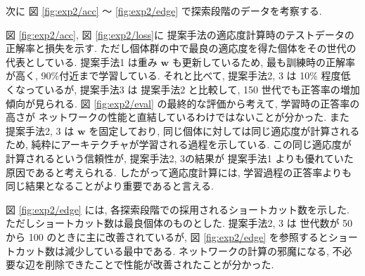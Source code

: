 次に 図 \ref{fig:exp2/acc} ～ \ref{fig:exp2/edge} で探索段階のデータを考察する.

図 \ref{fig:exp2/acc}, 図 \ref{fig:exp2/loss}に
提案手法の適応度計算時のテストデータの正解率と損失を示す.
ただし個体群の中で最良の適応度を得た個体をその世代の代表としている.
提案手法1 は重み $\bm{w}$ も更新しているため, 最も訓練時の正解率が高く, 90\%付近まで学習している.
それと比べて, 提案手法2, 3 は 10\% 程度低くなっているが,
提案手法3 は 提案手法2 と比較して, 150 世代でも正答率の増加傾向が見られる.
図 \ref{fig:exp2/eval} の最終的な評価から考えて, 学習時の正答率の高さが
ネットワークの性能と直結しているわけではないことが分かった.
また 提案手法2, 3 は $\bm{w}$ を固定しており, 同じ個体に対しては同じ適応度が計算されるため,
純粋にアーキテクチャが学習される過程を示している.
この同じ適応度が計算されるという信頼性が, 提案手法2, 3の結果が 提案手法1 よりも優れていた
原因であると考えられる.
したがって適応度計算には, 学習過程の正答率よりも同じ結果となることがより重要であると言える.

図 \ref{fig:exp2/edge} には, 各探索段階での採用されるショートカット数を示した.
ただしショートカット数は最良個体のものとした.
提案手法2, 3 は 世代数が 50 から 100 のときに主に改善されているが,
図 \ref{fig:exp2/edge} を参照するとショートカット数は減少している最中である.
ネットワークの計算の邪魔になる, 不必要な辺を削除できたことで性能が改善されたことが分かった.


